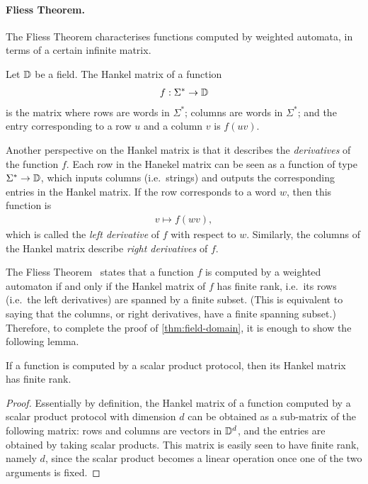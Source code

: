 \paragraph*{Fliess Theorem.} The Fliess Theorem characterises functions computed by weighted automata, in terms of a certain infinite matrix.

\begin{definition}\label{def:hankel-matrix}
    Let $\mathbb D$ be a field. The Hankel matrix of a function 
    \begin{align*}
    f : \Sigma^* \to \mathbb D
    \end{align*}  
    is the matrix where rows are words in $\Sigma^*$; columns are words in $\Sigma^*$; and the entry corresponding to a row $u$ and a column $v$ is $f(uv)$.
\end{definition}

Another perspective on the Hankel matrix is that it describes the \emph{derivatives} of the function $f$. Each row in the Hanekel matrix can be seen as a function of type $\Sigma^* \to \mathbb D$, which inputs columns (i.e.~strings) and outputs the corresponding entries in the Hankel matrix. If the row corresponds to a word $w$, then this function is
\begin{align*}
v \mapsto f(wv),
\end{align*}
which is called the \emph{left derivative} of $f$ with respect to $w$. Similarly, the columns of the Hankel matrix describe \emph{right derivatives} of $f$.

The Fliess Theorem~\cite[Theorem 2.1.1]{fliess1974} states that a function $f$ is computed by a weighted automaton if and only if the Hankel matrix of $f$ has finite rank, i.e.~its rows (i.e.~the left derivatives) are spanned by a finite subset. (This is equivalent to saying that the columns, or right derivatives, have a finite spanning subset.) Therefore, to complete the proof of \cref{thm:field-domain}, it is enough to show the following lemma.

\begin{lemma}\label{lem:hankel-finite-rank}
    If a function is computed by a scalar product protocol, then its Hankel matrix has finite rank.
\end{lemma}
\begin{proof}
    Essentially by definition, the Hankel matrix of a function computed by a scalar product protocol with dimension $d$ can be obtained as a sub-matrix of the following matrix: rows and columns are vectors in $\mathbb D^d$, and the entries are obtained by taking scalar products. This matrix is easily seen to have finite rank, namely $d$, since the scalar product  becomes a linear operation once one of the two arguments is fixed.
\end{proof}
